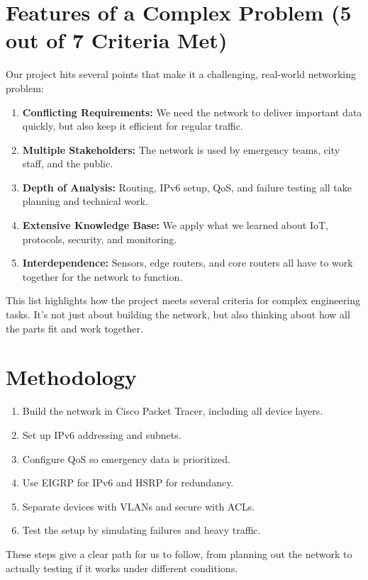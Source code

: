 \documentclass[12pt,a4paper]{article}
\begin{document}
\vspace{1em}

\section*{Features of a Complex Problem (5 out of 7 Criteria Met)}
Our project hits several points that make it a challenging, real-world networking problem:
\begin{enumerate}[label=5.\arabic*, nosep]
    \item \textbf{Conflicting Requirements:} We need the network to deliver important data quickly, but also keep it efficient for regular traffic.
    \item \textbf{Multiple Stakeholders:} The network is used by emergency teams, city staff, and the public.
    \item \textbf{Depth of Analysis:} Routing, IPv6 setup, QoS, and failure testing all take planning and technical work.
    \item \textbf{Extensive Knowledge Base:} We apply what we learned about IoT, protocols, security, and monitoring.
    \item \textbf{Interdependence:} Sensors, edge routers, and core routers all have to work together for the network to function.
\end{enumerate}
This list highlights how the project meets several criteria for complex engineering tasks. It’s not just about building the network, but also thinking about how all the parts fit and work together.

\vspace{1em}

\section*{Methodology}
\begin{enumerate}[label=6.\arabic*, nosep]
    \item Build the network in Cisco Packet Tracer, including all device layers.
    \item Set up IPv6 addressing and subnets.
    \item Configure QoS so emergency data is prioritized.
    \item Use EIGRP for IPv6 and HSRP for redundancy.
    \item Separate devices with VLANs and secure with ACLs.
    \item Test the setup by simulating failures and heavy traffic.
\end{enumerate}
These steps give a clear path for us to follow, from planning out the network to actually testing if it works under different conditions.
\end{document}
